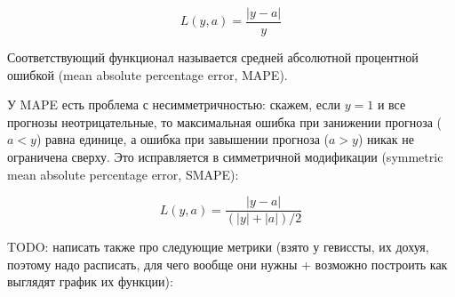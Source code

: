 \[
  L(y, a) = \frac{|y - a|}{y}
\]

Соответствующий функционал называется средней абсолютной процентной
ошибкой (mean absolute percentage error, MAPE).

У MAPE есть проблема с несимметричностью: скажем, если $y = 1$ и все
прогнозы неотрицательные, то максимальная ошибка при занижении
прогноза ($a < y$) равна единице, а ошибка при завышении прогноза ($a
> y$) никак не ограничена сверху. Это исправляется в симметричной
модификации (symmetric mean absolute percentage error, SMAPE):

\[
  L(y, a) = \frac{|y - a|}{(|y| + |a|)/2}
\]

TODO: написать также про следующие метрики (взято у гевиссты, их
  дохуя, поэтому надо расписать, для чего вообще они нужны + возможно
построить как выглядят график их функции):

